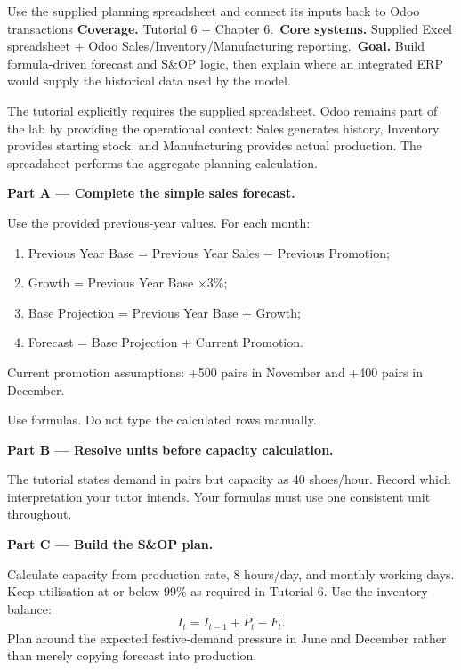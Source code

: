 
\begin{labproject}{Use the supplied planning spreadsheet and connect its inputs back to Odoo transactions}
\textbf{Coverage.} Tutorial 6 + Chapter 6.\
\textbf{Core systems.} Supplied Excel spreadsheet + Odoo Sales/Inventory/Manufacturing reporting.\
\textbf{Goal.} Build formula-driven forecast and S\&OP logic, then explain where an integrated ERP would supply the historical data used by the model.

\begin{labmode}
The tutorial explicitly requires the supplied spreadsheet. Odoo remains part of the lab by providing the operational context: Sales generates history, Inventory provides starting stock, and Manufacturing provides actual production. The spreadsheet performs the aggregate planning calculation.
\end{labmode}

\medskip\noindent\textbf{Part A --- Complete the simple sales forecast.}

Use the provided previous-year values. For each month:
\begin{enumerate}
  \item Previous Year Base = Previous Year Sales $-$ Previous Promotion;
  \item Growth = Previous Year Base $\times 3\%$;
  \item Base Projection = Previous Year Base + Growth;
  \item Forecast = Base Projection + Current Promotion.
\end{enumerate}

Current promotion assumptions: +500 pairs in November and +400 pairs in December.

Use formulas. Do not type the calculated rows manually.

\medskip\noindent\textbf{Part B --- Resolve units before capacity calculation.}

The tutorial states demand in pairs but capacity as 40 shoes/hour. Record which interpretation your tutor intends. Your formulas must use one consistent unit throughout.

\medskip\noindent\textbf{Part C --- Build the S\&OP plan.}

Calculate capacity from production rate, 8 hours/day, and monthly working days. Keep utilisation at or below 99\% as required in Tutorial 6. Use the inventory balance:
\[
I_t=I_{t-1}+P_t-F_t.
\]
Plan around the expected festive-demand pressure in June and December rather than merely copying forecast into production.


\end{labproject}
